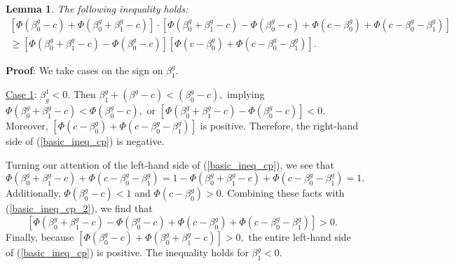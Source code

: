 \documentclass[11pt]{article}
\newtheorem{lemma}{Lemma}
\begin{document}
\begin{appendices}
\begin{refsection}
\begin{lemma}
The following inequality holds: 
\begin{multline}\label{basic_ineq_cp}
\left[\Phi(\beta^g_0 - c) + \Phi(\beta^g_0 + \beta^g_1 - c) \right] \cdot \left[\Phi(\beta_0^g + \beta_1^g - c) - \Phi(\beta_0^g - c) + \Phi(c - \beta^g_0) + \Phi(c - \beta_0^g - \beta_1^g) \right] \\ \geq \left[\Phi(\beta_0^g + \beta_1^g - c) - \Phi(\beta_0^g - c)\right]\left[\Phi(c - \beta^g_0) + \Phi(c - \beta_0^g - \beta_1^g)\right].
\end{multline}
\end{lemma}
\textbf{Proof}: We take cases on the sign on $\beta^g_1$.

\noindent
\underline{Case 1}: $\beta^1_g < 0$. Then $ \beta^g_1 + (\beta^g - c) < (\beta^g_0 - c),$ implying $\Phi(\beta^g_0 + \beta^g_1 - c) < \Phi(\beta^g_0 - c),$ or $[\Phi(\beta^g_0 + \beta^g_1 - c) - \Phi(\beta^g_0 - c)] < 0.$ Moreover, $[\Phi(c - \beta^g_0) + \Phi(c - \beta_0^g - \beta_1^g)]$ is positive. Therefore, the right-hand side of (\ref{basic_ineq_cp}) is negative.

Turning our attention of the left-hand side of (\ref{basic_ineq_cp}), we see that
\begin{equation}\label{basic_ineq_cp_2}
\Phi(\beta^g_0 + \beta^g_1 - c) + \Phi( c - \beta^g_0 - \beta^g_1) = 1 -\Phi(\beta^g_0 + \beta^g_1 - c) + \Phi( c - \beta^g_0 - \beta^g_1) = 1.
\end{equation}
Additionally, $\Phi(\beta^g_0 - c) < 1$ and $ \Phi(c - \beta^g_0) > 0$. Combining these facts with (\ref{basic_ineq_cp_2}), we find that
$$ \left[\Phi(\beta_0^g + \beta_1^g - c) - \Phi(\beta_0^g - c) + \Phi(c - \beta^g_0) + \Phi(c - \beta_0^g - \beta_1^g) \right] > 0. $$ Finally, because $\left[\Phi(\beta^g_0 - c) + \Phi(\beta^g_0 + \beta^g_1 - c) \right] > 0,$ the entire left-hand side of (\ref{basic_ineq_cp}) is positive. The inequality holds for $\beta^g_1 < 0$.


\end{refsection}
\end{appendices}
\end{document}
